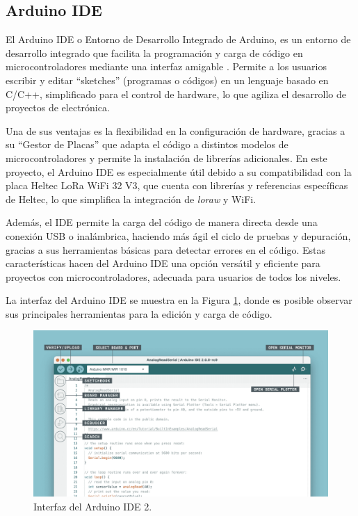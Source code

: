 \subsection{Arduino IDE}

El Arduino IDE o Entorno de Desarrollo Integrado de Arduino, es un entorno de desarrollo integrado que facilita la programación y carga de código en microcontroladores mediante una interfaz amigable \cite{ArduinoIDE}. Permite a los usuarios escribir y editar “sketches” (programas o códigos) en un lenguaje basado en C/C++, simplificado para el control de hardware, lo que agiliza el desarrollo de proyectos de electrónica.

Una de sus ventajas es la flexibilidad en la configuración de hardware, gracias a su “Gestor de Placas” que adapta el código a distintos modelos de microcontroladores y permite la instalación de librerías adicionales. En este proyecto, el Arduino IDE es especialmente útil debido a su compatibilidad con la placa Heltec LoRa WiFi 32 V3, que cuenta con librerías y referencias específicas de Heltec, lo que simplifica la integración de \textit{\acrshort{loraw}} y WiFi.

Además, el IDE permite la carga del código de manera directa desde una conexión USB o inalámbrica, haciendo más ágil el ciclo de pruebas y depuración, gracias a sus herramientas básicas para detectar errores en el código. Estas características hacen del Arduino IDE una opción versátil y eficiente para proyectos con microcontroladores, adecuada para usuarios de todos los niveles.

La interfaz del Arduino IDE se muestra en la Figura \ref{fig:arduino_ide}, donde es posible observar sus principales herramientas para la edición y carga de código.

\begin{figure}[H]
\leavevmode
\begin{minipage}{\textwidth}
\begin{center}
    \includegraphics[width=1.0\textwidth]{./capitulo_03/figures/SW/ide-2-ino.png} %
    \caption{Interfaz del Arduino IDE 2\cite{ArduinoIDEImage}.}
    \label{fig:arduino_ide}
\end{center}
\end{minipage}
\end{figure}


